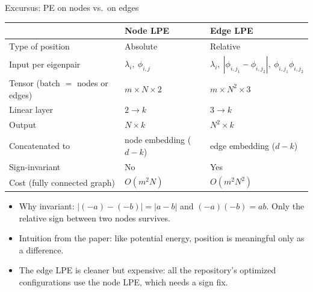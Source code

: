 \documentclass[aspectratio=169,11pt]{beamer}
\begin{document}
\begin{frame}{Excursus: PE on nodes vs.\ on edges}
  \centering
  \footnotesize
  \begin{tabular}{lll}
    \toprule
    & \textbf{Node LPE} & \textbf{Edge LPE} \\
    \midrule
    Type of position & Absolute & Relative \\
    Input per eigenpair & $\lambda_i,\ \phi_{i,j}$ &
      $\lambda_i,\ |\phi_{i,j_1} - \phi_{i,j_2}|,\ \phi_{i,j_1}\phi_{i,j_2}$ \\
    Tensor (batch $=$ nodes or edges) & $m \times N \times 2$ & $m \times N^2 \times 3$ \\
    Linear layer & $2 \to k$ & $3 \to k$ \\
    Output & $N \times k$ & $N^2 \times k$ \\
    Concatenated to & node embedding ($d-k$) & edge embedding ($d-k$) \\
    Sign-invariant & \alert{No} & \alert{Yes} \\
    Cost (fully connected graph) & $O(m^2 N)$ & \alert{$O(m^2 N^2)$} \\
    \bottomrule
  \end{tabular}

  \medskip
  \normalsize
  \raggedright
  \begin{itemize}
    \item Why invariant: $|(-a)-(-b)| = |a-b|$ and $(-a)(-b) = ab$. Only the
          \alert{relative} sign between two nodes survives.
    \item Intuition from the paper: like potential energy, position is meaningful
          only as a \alert{difference}.
    \item The edge LPE is cleaner but expensive: all the repository's optimized
          configurations use the \alert{node LPE}, which needs a sign fix.
  \end{itemize}
\end{frame}
\end{document}
